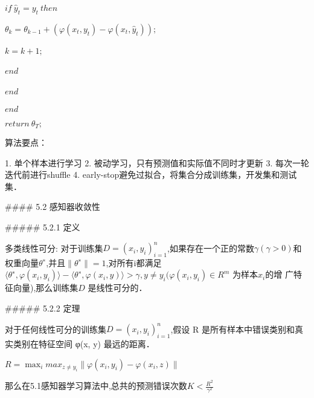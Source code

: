 ​		$if\  \hat y_t = y_t\ then$

​			$θ_k =θ_{k−1}+(φ(x_t,y_t)−φ(x_t,\hat y_t));$

​			$k=k+1;$

​		$end$

​	$end$

$end$

$return\  θ_T ;$

算法要点：

1. 单个样本进行学习
2. 被动学习，只有预测值和实际值不同时才更新
3. 每次一轮迭代前进行shuffle
4. early-stop避免过拟合，将集合分成训练集，开发集和测试集．

#### 5.2 感知器收敛性

##### 5.2.1 定义

多类线性可分: 对于训练集$D = {(x_i,y_i)}_{i=1}^{n}$,如果存在一个正的常数$γ(γ > 0)$和权重向量$θ^∗$,并且$∥θ^∗ ∥ = 1$,对所有i都满足 $⟨θ^∗, φ(x_i, y_i)⟩ − ⟨θ^∗, φ(x_i, y)⟩ > γ, y \ne y_i (φ(x_i, y_i) ∈ R^m$ 为样本$x_i $的增 广特征向量),那么训练集$D$ 是线性可分的．

##### 5.2.2 定理

对于任何线性可分的训练集$D = {(x_i,y_i)}_{i=1}^{n}​$,假设 R 是所有样本中错误类别和真实类别在特征空间 φ(x, y) 最远的距离．

$R =\mathop {max}_imax_{z\ne y_i}∥φ(x_i,y_i)−φ(x_i,z)∥$

那么在5.1感知器学习算法中,总共的预测错误次数$K <\frac{R^2} {γ^2}$


